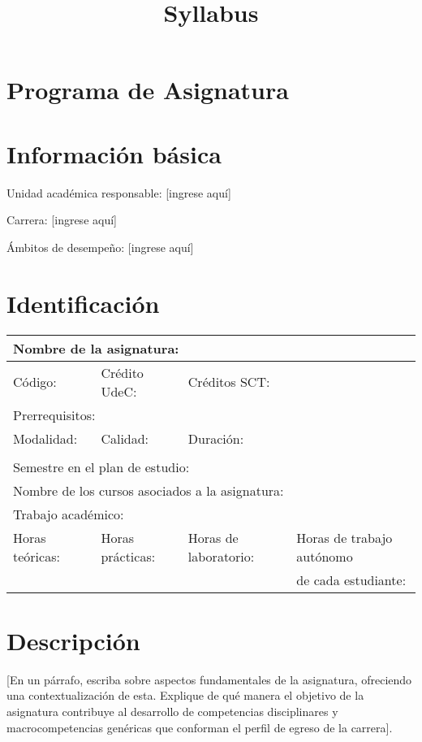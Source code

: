 \documentclass[11pt]{article}
\date{}
\title{Syllabus}
\begin{document}
\maketitle

\vspace{-60px}

\section*{Programa de Asignatura}
\label{sec:org17a7731}

\section{Información básica}
\label{sec:org5356385}
Unidad académica responsable: [ingrese aquí]

Carrera: [ingrese aquí]

Ámbitos de desempeño: [ingrese aquí]
\section{Identificación}
\label{sec:org2feff26}

\begin{center}
\begin{tabular}{|l|l|l|l|}
\hline
\multicolumn{4}{|l|}{Nombre de la asignatura:} \\
\hline
Código: & Crédito UdeC: & Créditos SCT: & \\
\hline
\multicolumn{4}{|l|}{Prerrequisitos:} \\
\hline
Modalidad: & Calidad: & Duración: & \\
 & & & \\
\hline
\multicolumn{4}{|l|}{Semestre en el plan de estudio:} \\
\hline
\multicolumn{4}{|l|}{Nombre de los cursos asociados a la asignatura:} \\
\hline
\multicolumn{4}{|l|}{Trabajo académico:} \\
\hline
Horas teóricas: & Horas prácticas: & Horas de laboratorio: & Horas de trabajo autónomo \\
 & & & de cada estudiante: \\
\hline
\end{tabular}
\end{center}

\section{Descripción}
\label{sec:org46bd365}
[En un párrafo, escriba sobre aspectos fundamentales de la asignatura, ofreciendo una contextualización de esta. Explique de qué manera el objetivo de la asignatura contribuye al desarrollo de competencias disciplinares y macrocompetencias genéricas que conforman el perfil de egreso de la carrera].
\end{document}
